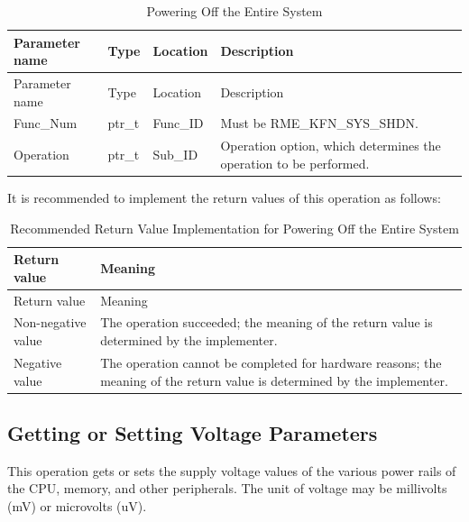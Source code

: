 \begin{xltabular}{\textwidth}{@{}>{\hsize\raggedright\arraybackslash}X>{\hsize\raggedright\arraybackslash}X>{\hsize\raggedright\arraybackslash}X>{\hsize\raggedright\arraybackslash}X@{}}
\caption{Powering Off the Entire System}\label{tab:8-47-power-off-system}\\
\toprule
Parameter name & Type & Location & Description\tabularnewline
\endfirsthead
\toprule
Parameter name & Type & Location & Description\tabularnewline
\midrule
\endhead
\bottomrule
\endlastfoot
Func\_Num & ptr\_t & Func\_ID &
Must be RME\_KFN\_SYS\_SHDN.\tabularnewline
Operation & ptr\_t & Sub\_ID &
Operation option, which determines the operation to be performed.\tabularnewline
\end{xltabular}
\nopagebreak[4]

It is recommended to implement the return values of this operation as follows:

\begin{xltabular}{\textwidth}{@{}>{\hsize\raggedright\arraybackslash}X>{\hsize\raggedright\arraybackslash}X@{}}
\caption{Recommended Return Value Implementation for Powering Off the Entire System}\label{tab:8-48-power-off-system-suggested-return-values}\\
\toprule
Return value & Meaning\tabularnewline
\endfirsthead
\toprule
Return value & Meaning\tabularnewline
\midrule
\endhead
\bottomrule
\endlastfoot
    Non-negative value & The operation succeeded; the meaning of the return value is determined by the implementer.\tabularnewline
    Negative value & The operation cannot be completed for hardware reasons; the meaning of the return value is determined by the implementer.\tabularnewline
\end{xltabular}
\nopagebreak[4]

\subsection{Getting or Setting Voltage Parameters}\label{subsec:8-get-or-set-voltage}

This operation gets or sets the supply voltage values of the various power rails of the CPU, memory, and other peripherals. The unit of voltage may be millivolts (mV) or microvolts (uV).

